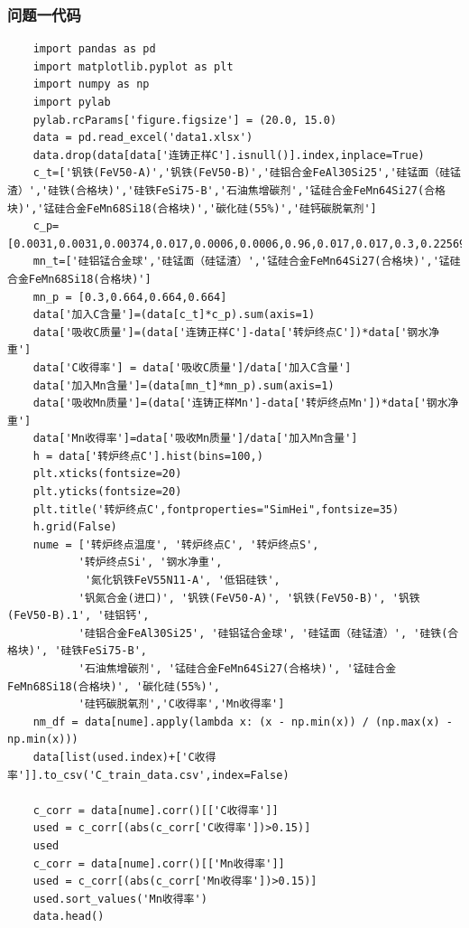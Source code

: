 \documentclass{xcumcmart}
\begin{document}
\subsubsection{问题一代码}
\begin{lstlisting}
	import pandas as pd
	import matplotlib.pyplot as plt
	import numpy as np
	import pylab
	pylab.rcParams['figure.figsize'] = (20.0, 15.0)
	data = pd.read_excel('data1.xlsx')
	data.drop(data[data['连铸正样C'].isnull()].index,inplace=True)
	c_t=['钒铁(FeV50-A)','钒铁(FeV50-B)','硅铝合金FeAl30Si25','硅锰面（硅锰渣）','硅铁(合格块)','硅铁FeSi75-B','石油焦增碳剂','锰硅合金FeMn64Si27(合格块)','锰硅合金FeMn68Si18(合格块)','碳化硅(55%)','硅钙碳脱氧剂']
	c_p=[0.0031,0.0031,0.00374,0.017,0.0006,0.0006,0.96,0.017,0.017,0.3,0.225692308]
	mn_t=['硅铝锰合金球','硅锰面（硅锰渣）','锰硅合金FeMn64Si27(合格块)','锰硅合金FeMn68Si18(合格块)']
	mn_p = [0.3,0.664,0.664,0.664]
	data['加入C含量']=(data[c_t]*c_p).sum(axis=1)
	data['吸收C质量']=(data['连铸正样C']-data['转炉终点C'])*data['钢水净重']
	data['C收得率'] = data['吸收C质量']/data['加入C含量']
	data['加入Mn含量']=(data[mn_t]*mn_p).sum(axis=1)
	data['吸收Mn质量']=(data['连铸正样Mn']-data['转炉终点Mn'])*data['钢水净重']
	data['Mn收得率']=data['吸收Mn质量']/data['加入Mn含量']
	h = data['转炉终点C'].hist(bins=100,)
	plt.xticks(fontsize=20)
	plt.yticks(fontsize=20)
	plt.title('转炉终点C',fontproperties="SimHei",fontsize=35)
	h.grid(False)
	nume = ['转炉终点温度', '转炉终点C', '转炉终点S',
		   '转炉终点Si', '钢水净重', 
			'氮化钒铁FeV55N11-A', '低铝硅铁',
		   '钒氮合金(进口)', '钒铁(FeV50-A)', '钒铁(FeV50-B)', '钒铁(FeV50-B).1', '硅铝钙',
		   '硅铝合金FeAl30Si25', '硅铝锰合金球', '硅锰面（硅锰渣）', '硅铁(合格块)', '硅铁FeSi75-B',
		   '石油焦增碳剂', '锰硅合金FeMn64Si27(合格块)', '锰硅合金FeMn68Si18(合格块)', '碳化硅(55%)',
		   '硅钙碳脱氧剂','C收得率','Mn收得率']
	nm_df = data[nume].apply(lambda x: (x - np.min(x)) / (np.max(x) - np.min(x)))
	data[list(used.index)+['C收得率']].to_csv('C_train_data.csv',index=False)
	
	c_corr = data[nume].corr()[['C收得率']]
	used = c_corr[(abs(c_corr['C收得率'])>0.15)]
	used
	c_corr = data[nume].corr()[['Mn收得率']]
	used = c_corr[(abs(c_corr['Mn收得率'])>0.15)]
	used.sort_values('Mn收得率')
	data.head()
	
	
\end{lstlisting}
\end{document}
